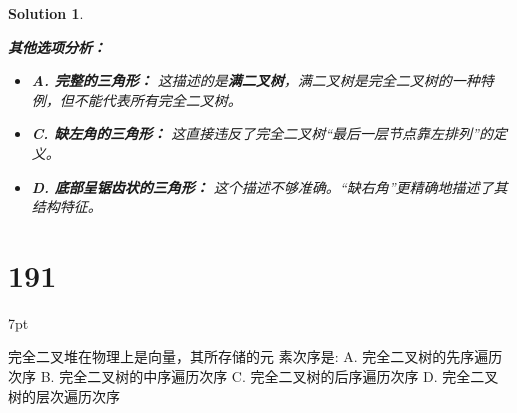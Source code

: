 \documentclass[UTF8]{report}
\newtheorem{solution}{Solution}
\theoremstyle{MyLineTheoremStyle} %
\theoremstyle{MyBlockTheoremStyle} %
\theoremstyle{MySubsubsectionStyle} %
\newenvironment{graybox}{%
        \def\FrameCommand{%
        \hspace{1pt}%
        {\color{gray}\small \vrule width 2pt}%
        {\color{graybox_color}\vrule width 4pt}%
        \colorbox{graybox_color}%
        }%
        \MakeFramed{\advance\hsize-\width\FrameRestore}%
        \noindent\hspace{-4.55pt}%
        \begin{adjustwidth}{}{7pt}%
        \vspace{2pt}\vspace{2pt}%
        }
        {%
        \vspace{2pt}\end{adjustwidth}\endMakeFramed%
        }
\begin{document}
\begin{solution}
\begin{enumerate}
\end{enumerate}

\textbf{其他选项分析：}
\begin{itemize}
    \item \textbf{A. 完整的三角形：} 这描述的是\textbf{满二叉树}，满二叉树是完全二叉树的一种特例，但不能代表所有完全二叉树。
    \item \textbf{C. 缺左角的三角形：} 这直接违反了完全二叉树“最后一层节点靠左排列”的定义。
    \item \textbf{D. 底部呈锯齿状的三角形：} 这个描述不够准确。“缺右角”更精确地描述了其结构特征。
\end{itemize}
\end{solution}


\section*{191}
\begin{graybox}
完全二叉堆在物理上是向量，其所存储的元
素次序是:
A. 完全二叉树的先序遍历次序
B. 完全二叉树的中序遍历次序
C. 完全二叉树的后序遍历次序
D. 完全二叉树的层次遍历次序
\end{graybox}
\end{document}
